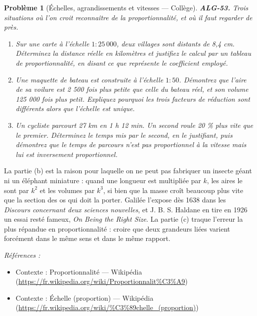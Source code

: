 \documentclass[11pt]{article}
\newtheorem{problem}{Problème}
\newenvironment{refs}{\par\small\noindent\emph{Références :}\begin{itemize}\setlength\itemsep{0pt}}{\end{itemize}\normalsize}
\begin{document}
\bigskip

\begin{problem}[{Échelles, agrandissements et vitesses --- Collège}]
\textbf{ALG-53.} Trois situations où l'on croit reconnaître de la proportionnalité, et où il faut
regarder de près.
\begin{enumerate}
\item[(a)] Sur une carte à l'échelle $ 1 : 25\,000 $, deux villages sont distants de 8,4 cm. Déterminez
la distance réelle en kilomètres et justifiez le calcul par un tableau de proportionnalité, en
disant ce que représente le coefficient employé.
\item[(b)] Une maquette de bateau est construite à l'échelle $ 1 : 50 $. Démontrez que l'aire de sa
voilure est 2 500 fois plus petite que celle du bateau réel, et son volume 125 000 fois plus petit.
Expliquez pourquoi les trois facteurs de réduction sont différents alors que l'échelle est
unique.
\item[(c)] Un cycliste parcourt 27 km en 1 h 12 min. Un second roule 20 \% plus vite que le premier.
Déterminez le temps mis par le second, en le justifiant, puis démontrez que le temps de parcours
n'est pas proportionnel à la vitesse mais lui est inversement proportionnel.
\end{enumerate}

\end{problem}

\noindent La partie (b) est la raison pour laquelle on ne peut pas fabriquer un insecte
géant ni un éléphant miniature : quand une longueur est multipliée par $ k $, les aires le sont
par $ k^2 $ et les volumes par $ k^3 $, si bien que la masse croît beaucoup plus vite que la
section des os qui doit la porter. Galilée l'expose dès 1638 dans les \textit{Discours concernant deux
sciences nouvelles}, et J. B. S. Haldane en tire en 1926 un essai resté fameux, \textit{On Being the
Right Size}. La partie (c) traque l'erreur la plus répandue en proportionnalité : croire que
deux grandeurs liées varient forcément dans le même sens et dans le même rapport.

\begin{refs}
\item Contexte : Proportionnalité --- Wikipédia (\url{https://fr.wikipedia.org/wiki/Proportionnalit%C3%A9})
\item Contexte : Échelle (proportion) --- Wikipédia (\url{https://fr.wikipedia.org/wiki/%C3%89chelle_(proportion)})
\end{refs}
\end{document}
